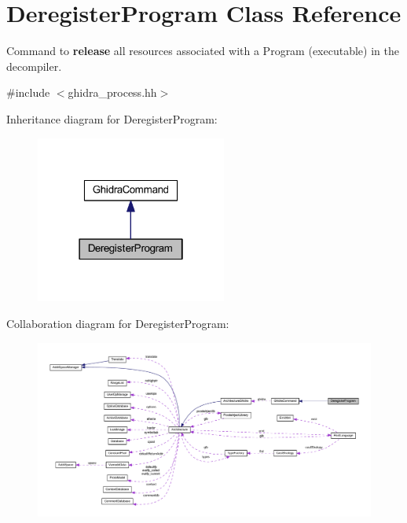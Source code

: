 \hypertarget{class_deregister_program}{}\section{Deregister\+Program Class Reference}
\label{class_deregister_program}


Command to {\bfseries{release}} all resources associated with a Program (executable) in the decompiler.  




{\ttfamily \#include $<$ghidra\+\_\+process.\+hh$>$}



Inheritance diagram for Deregister\+Program\+:
\nopagebreak
\begin{figure}[H]
\begin{center}
\leavevmode
\includegraphics[width=178pt]{class_deregister_program__inherit__graph}
\end{center}
\end{figure}


Collaboration diagram for Deregister\+Program\+:
\nopagebreak
\begin{figure}[H]
\begin{center}
\leavevmode
\includegraphics[width=350pt]{class_deregister_program__coll__graph}
\end{center}
\end{figure}
